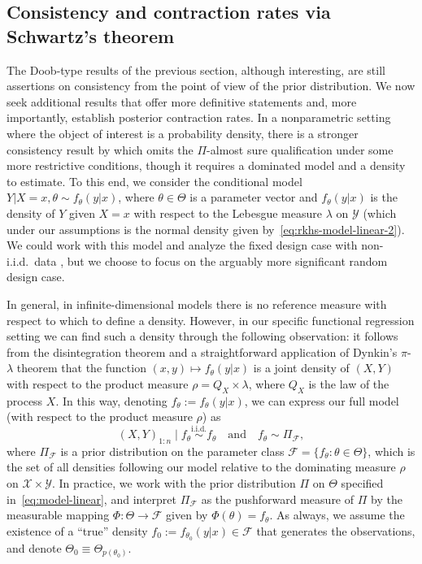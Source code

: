 \documentclass{article}
\numberwithin{equation}{section}
\theoremstyle{plain}
\theoremstyle{definition}
\begin{document}
\subsection{Consistency and contraction rates via Schwartz's theorem}\label{sec:consistency-schwartz}

The Doob-type results of the previous section, although interesting, are still assertions on consistency from the point of view of the prior distribution. We now seek additional results that offer more definitive statements and, more importantly, establish posterior contraction rates. In a nonparametric setting where the object of interest is a probability density, there is a stronger consistency result by \citet{schwartz1965bayes} which omits the \(\Pi\)-almost sure qualification under some more restrictive conditions, though it requires a dominated model and a density to estimate. To this end, we consider the conditional model \(Y|X=x, \theta \sim f_\theta(y|x)\), where \(\theta\in\Theta\) is a parameter vector and \(f_\theta(y|x)\) is the density of \(Y\) given \(X=x\) with respect to the Lebesgue measure \(\lambda\) on \(\mathcal Y\) (which under our assumptions is the normal density given by~\eqref{eq:rkhs-model-linear-2}). We could work with this model and analyze the fixed design case with non-i.i.d.\ data \citep[see][]{choi2008remarks}, but we choose to focus on the arguably more significant random design case.

In general, in infinite-dimensional models there is no reference measure with respect to which to define a density. However, in our specific functional regression setting we can find such a density through the following observation: it follows from the disintegration theorem and a straightforward application of Dynkin's \(\pi\)-\(\lambda\) theorem that the function \((x,y)\mapsto f_\theta(y|x)\) is a joint density of \((X,Y)\) with respect to the product measure \(\rho=Q_X\times \lambda\), where \(Q_X\) is the law of the process \(X\). In this way, denoting \(f_\theta := f_\theta(y|x)\), we can express our full model (with respect to the product measure \(\rho\)) as
\[
  (X, Y)_{1:n} \mid f_\theta \stackrel{\text{i.i.d.}}{\sim} f_\theta \quad \text{and} \quad f_\theta \sim \Pi_{\mathcal F},
\]
where \(\Pi_{\mathcal F}\) is a prior distribution on the parameter class \(\mathcal F=\{f_\theta: \theta \in \Theta\}\), which is the set of all densities following our model relative to the dominating measure \(\rho\) on \(\mathcal X \times \mathcal Y\). In practice, we work with the prior distribution \(\Pi\) on \(\Theta\) specified in~\eqref{eq:model-linear}, and interpret \(\Pi_{\mathcal F}\) as the pushforward measure of \(\Pi\) by the measurable mapping \(\Phi: \Theta \to \mathcal F\) given by \(\Phi(\theta)= f_\theta\). As always, we assume the existence of a ``true'' density \(f_0 :=f_{\theta_0}(y|x)\in \mathcal F\) that generates the observations, and denote \(\Theta_0\equiv \Theta_{p(\theta_0)}\).
\end{document}

